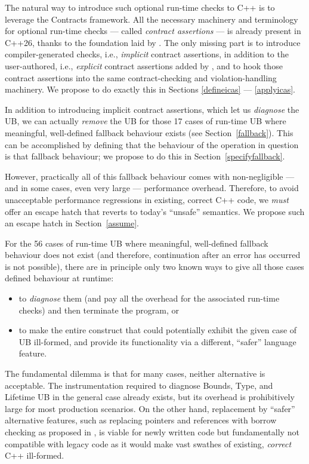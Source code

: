 The natural way to introduce such optional run-time checks to C++ is to leverage the Contracts framework. All the necessary machinery and terminology for optional run-time checks --- called \emph{contract assertions} --- is already present in C++26, thanks to the foundation laid by \cite{P2900R14}. The only missing part is to introduce compiler-generated checks, i.e., \emph{implicit} contract assertions, in addition to the user-authored, i.e., \emph{explicit} contract assertions added by \cite{P2900R14}, and to hook those contract assertions into the same contract-checking and violation-handling machinery. We propose to do exactly this in Sections \ref{defineicas} --- \ref{applyicas}.

In addition to introducing implicit contract assertions, which let us \emph{diagnose} the UB, we can actually \emph{remove} the UB for those 17 cases of run-time UB where meaningful, well-defined fallback behaviour exists (see Section~\ref{fallback}). This can be accomplished by defining that the behaviour of the operation in question is that fallback behaviour; we propose to do this in Section~\ref{specifyfallback}.

However, practically all of this fallback behaviour comes with non-negligible --- and in some cases, even very large --- performance overhead. Therefore, to avoid unacceptable performance regressions in existing, correct C++ code, we \emph{must} offer an escape hatch that reverts to today's ``unsafe'' semantics. We propose such an escape hatch in Section~\ref{assume}.

For the 56 cases of run-time UB where meaningful, well-defined fallback behaviour does not exist (and therefore, continuation after an error has occurred is not possible), there are in principle only two known ways to give all those cases defined behaviour at runtime:
\begin{itemize}
\item to \emph{diagnose} them (and pay all the overhead for the associated run-time checks) and then terminate the program, or
\item to make the entire construct that could potentially exhibit the given case of UB ill-formed, and provide its functionality via a different, ``safer'' language feature.
\end{itemize}

The fundamental dilemma is that for many cases, neither alternative is acceptable. The instrumentation required to diagnose Bounds, Type, and Lifetime UB in the general case already exists, but its overhead is prohibitively large for most production scenarios. On the other hand, replacement by ``safer'' alternative features, such as replacing pointers and references with borrow checking as proposed in \cite{P3390R0}, is viable for newly written code but fundamentally not compatible with legacy code as it would make vast swathes of existing, \emph{correct} C++ ill-formed.

